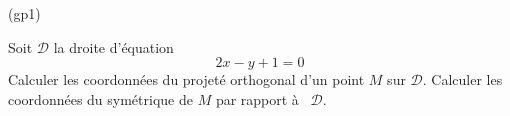 \begin{tiny}(gp1)\end{tiny}
Soit $\mathcal{D}$ la droite d'équation
\[2x-y+1=0\]
Calculer les coordonnées du projeté orthogonal d'un point $M$ sur $\mathcal{D}$. Calculer les coordonnées du symétrique de $M$ par rapport à  $\mathcal{D}$.